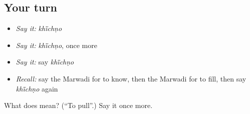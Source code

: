\subsection*{Your turn}
\begin{itemize}
\raggedright
  \item \emph{Say it:} \emph{khī̃chṇo}
  \item \emph{Say it:} \emph{khī̃chṇo}, once more
  \item \emph{Say it:} say \emph{khī̃chṇo}
  \item \emph{Recall:} say the Marwadi for to know, then the Marwadi for to fill, then say \emph{khī̃chṇo} again
\end{itemize}

\begin{tcolorbox}[breakable,colback=teal!4,colframe=teal!35!black,title={Before you move on}]
What does  mean? (\textquotedblleft{}To pull\textquotedblright{}.) Say it once more.
\end{tcolorbox}
